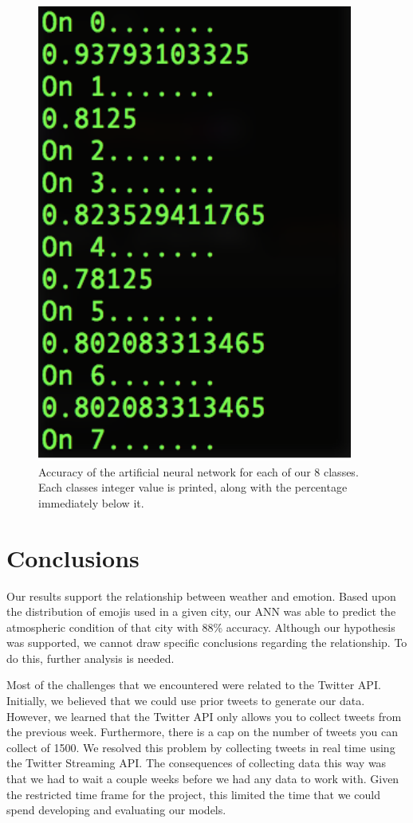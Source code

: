 \documentclass[12pt]{article}
\begin{document}
\begin{figure}[h]
\includegraphics[scale=0.6]{ann}
\centering
\caption{Accuracy of the artificial neural network for each of our 8 classes. Each classes integer value is printed, along with the percentage immediately below it.}
\label{fig:ann}
\end{figure}

\section{Conclusions}\label{conclusions}
Our results support the relationship between weather and emotion. Based upon the distribution of emojis used in a given city, our ANN was able to predict the atmospheric condition of that city with 88\% accuracy. Although our hypothesis was supported, we cannot draw specific conclusions regarding the relationship. To do this, further analysis is needed.

Most of the challenges that we encountered were related to the Twitter API. Initially, we believed that we could use prior tweets to generate our data. However, we learned that the Twitter API only allows you to collect tweets from the previous week. Furthermore, there is a cap on the number of tweets you can collect of 1500. We resolved this problem by collecting tweets in real time using the Twitter Streaming API. The consequences of collecting data this way was that we had to wait a couple weeks before we had any data to work with. Given the restricted time frame for the project, this limited the time that we could spend developing and evaluating our models.
\end{document}
